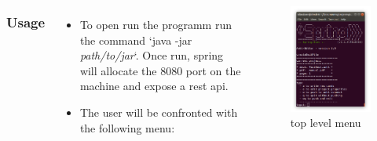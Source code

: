 \documentclass[xcolor=dvipanames]{beamer}
\begin{document}
	\begin{frame}	
	\begin{columns}

	
		\frametitle{Usage}
		\begin{itemize}
			\item To open run the programm run the command `java -jar \emph{path/to/jar}`. Once run, spring will allocate the 8080 port on the machine and expose a rest api.
		
			\item The user will be confronted with the following menu:			
		\end{itemize}	
		
		
			\begin{figure}
			\includegraphics[scale=0.35]{./img/topLevelMenu.png}
			\caption{top level menu}
			\end{figure}
			
	\end{columns}
	\end{frame}
	
\end{document}
